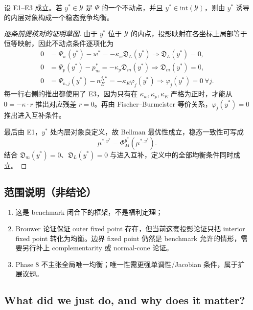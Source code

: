 \begin{proposition}
设 E1--E3 成立。若 $y^*\in\mathcal Y$ 是 $\Psi$ 的一个不动点，并且 $y^*\in\mathrm{int}(\mathcal Y)$，则由 $y^*$ 诱导的内层对象构成一个稳态竞争均衡。
\end{proposition}

\begin{proof}[逐条前提核对的证明草图]
由于 $y^*$ 位于 $\mathcal Y$ 的内点，投影映射在各坐标上局部等于恒等映射，因此不动点条件逐项化为
\begin{align*}
0&=\Psi_w(y^*)-w^*=-\kappa_w\mathfrak D_L(y^*)
\Rightarrow \mathfrak D_L(y^*)=0,\\
0&=\Psi_p(y^*)-p_m^*=-\kappa_p\mathfrak D_m(y^*)
\Rightarrow \mathfrak D_m(y^*)=0,\\
0&=\Psi_{n,j}(y^*)-n_E^{j,*}=-\kappa_E\varphi_j(y^*)
\Rightarrow \varphi_j(y^*)=0\ \forall j.
\end{align*}
每一行右侧的推出都使用了 E3，因为只有在 $\kappa_w,\kappa_p,\kappa_E$ 严格为正时，才能从 $0=-\kappa\cdot r$ 推出对应残差 $r=0$。再由 Fischer--Burmeister 等价关系，$\varphi_j(y^*)=0$ 推出进入互补条件。

最后由 E1，$y^*$ 处内层对象良定义，故 Bellman 最优性成立，稳态一致性可写成
\[
\mu^{*,y^*}=\Phi_M^{y^*}(\mu^{*,y^*}).
\]
结合 $\mathfrak D_m(y^*)=0$、$\mathfrak D_L(y^*)=0$ 与进入互补，定义中的全部均衡条件同时成立。
\end{proof}

\subsection{范围说明（非结论）}

\begin{enumerate}
    \item 这是 benchmark 闭合下的框架，不是福利定理；
    \item Brouwer 论证保证 outer fixed point 存在，但当前这套投影论证只把 interior fixed point 转化为均衡。边界 fixed point 仍然是 benchmark 允许的情形，需要另行补上 complementarity 或 normal-cone 论证。
    \item Phase 8 不主张全局唯一均衡；唯一性需更强单调性/Jacobian 条件，属于扩展议题。
\end{enumerate}

\subsection{What did we just do, and why does it matter?}

